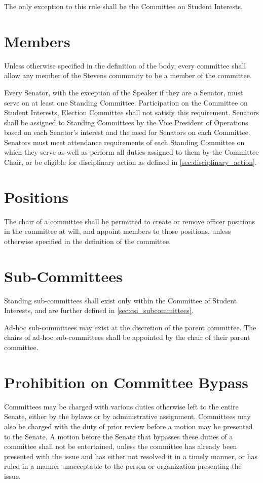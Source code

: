\documentclass[12pt]{scrreprt}
\begin{document}
The only exception to this rule shall be the Committee on Student Interests.
\section{Members}
Unless otherwise specified in the definition of the body, every committee 
shall allow any member of the Stevens community to be a member of the 
committee.

Every Senator, with the exception of the Speaker if they are a Senator, must serve on at least one Standing Committee. Participation on the Committee on Student Interests, Election Committee shall not satisfy this requirement. 
Senators shall be assigned to Standing Committees by the Vice President of Operations based on each Senator’s interest and the need for Senators on each Committee. Senators must meet attendance requirements of each Standing Committee on which they serve as well as perform all duties assigned to them by the Committee Chair, or be eligible for disciplinary action as defined in \ref{sec:disciplinary_action}.

\section{Positions}
The chair of a committee shall be permitted to create or remove officer 
positions in the committee at will, and appoint members to those positions, 
unless otherwise specified in the definition of the committee.

\section{Sub-Committees}
Standing sub-committees shall exist only within the Committee of Student 
Interests, and are further defined in \ref{sec:csi_subcommittees}.

Ad-hoc sub-committees may exist at the discretion of the parent committee. The 
chairs of ad-hoc sub-committees shall be appointed by the chair of their 
parent committee.

\section{Prohibition on Committee Bypass}
Committees may be charged with various duties otherwise left to the entire 
Senate, either by the bylaws or by administrative assignment. Committees may 
also be charged with the duty of prior review before a motion may be presented 
to the Senate. A motion before the Senate that bypasses these duties of a 
committee shall not be entertained, unless the committee has already been 
presented with the issue and has either not resolved it in a timely manner, or 
has ruled in a manner unacceptable to the person or organization presenting 
the issue.
\end{document}
